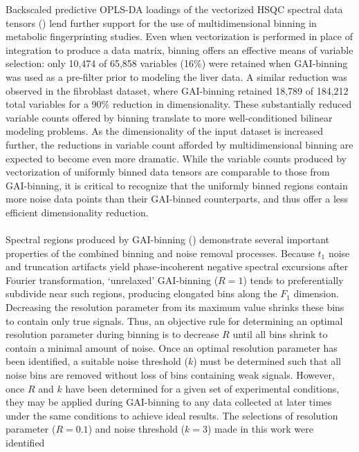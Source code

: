 \begin{doublespace}
Backscaled predictive OPLS-DA loadings of the vectorized \hcnmr{} HSQC spectral
data tensors () lend further support for the use of
multidimensional binning in metabolic fingerprinting studies. Even when
vectorization is performed in place of integration to produce a data matrix,
binning offers an effective means of variable selection: only 10,474 of 65,858
variables (16\%) were retained when GAI-binning was used as a pre-filter prior
to modeling the liver data. A similar reduction was observed in the fibroblast
dataset, where GAI-binning retained 18,789 of 184,212 total variables for
a 90\% reduction in dimensionality. These substantially reduced variable
counts offered by binning translate to more well-conditioned bilinear
modeling problems. As the dimensionality of the input dataset is
increased further, the reductions in variable count afforded by
multidimensional binning are expected to become even
more dramatic. While the variable counts produced by vectorization of uniformly
binned data tensors are comparable to those from GAI-binning, it is critical to
recognize that the uniformly binned regions contain more noise data points than
their GAI-binned counterparts, and thus offer a less efficient dimensionality
reduction.
\\\\
Spectral regions produced by GAI-binning ()
demonstrate several important properties of the combined binning and noise
removal processes. Because $t_1$ noise and truncation artifacts yield
phase-incoherent negative spectral excursions after Fourier
transformation, `unrelaxed' GAI-binning ($R = 1$) tends to
preferentially subdivide near such regions, producing
elongated bins along the $F_1$ dimension. Decreasing the resolution parameter
from its maximum value shrinks these bins to contain only true signals. Thus,
an objective rule for determining an optimal resolution parameter during
binning is to decrease $R$ until all bins shrink to contain a minimal amount
of noise. Once an optimal resolution parameter has been identified, a suitable
noise threshold ($k$) must be determined such that all noise bins are removed
without loss of bins containing weak signals. However, once $R$ and $k$ have
been determined for a given set of experimental conditions, they may be applied
during GAI-binning to any data collected at later times under the same
conditions to achieve ideal results. The selections of resolution parameter
($R = 0.1$) and noise threshold ($k = 3$) made in this work were identified

\end{doublespace}
